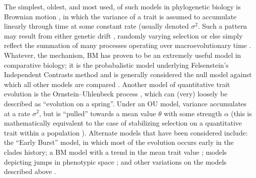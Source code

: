\documentclass[12pt]{article}
\begin{document}
The simplest, oldest, and most used, of such models in phylogenetic biology is Brownian motion \citep[BM;][]{Edwards1964, Felsenstein1971, Thompson1975}, in which the variance of a trait is assumed to accumulate linearly through time at some constant rate (usually denoted $\sigma^2$. Such a pattern may result from either genetic drift \citep{Lande1976, Hansen1996}, randomly varying selection \citep{Felsenstein1973, Felsenstein1988} or else simply reflect the summation of many processes operating over macroevolutionary time \citep{Hansen1996, Uyeda2011, PennellHarmon, PennellPE}. Whatever, the mechanism, BM has proven to be an extremely useful model in comparative biology; it is the probabalistic model underlying Felsenstein's Independent Contrasts method \citep[][see below]{Felsenstein1985} and is generally considered the null model against which all other models are compared \citep{Blomberg2003}. Another model of quantitative trait evolution is the Ornstein--Uhlenbeck process \citep[OU;][]{Felsenstein1988, Hansen1997}, which can (very) loosely be described as ``evolution on a spring''. Under an OU model, variance accumulates at a rate $\sigma^2$, but is ``pulled'' towards a mean value $\theta$ with some strength $\alpha$ (this is mathematically equivalent to the case of stabilizing selection on a quantitative trait within a population \citep{Lande1976}). Alternate models that have been considered include: the ``Early Burst'' \citep[EB;][]{Blomberg2003, Harmon2010, SlaterPennell} model, in which most of the evolution occurs early in the clades history; a BM model with a trend in the mean trait value \citep{Hunt2006}; models depicting jumps in phenotypic space \citep{Landis2012, Eastmanlevy}; and other variations on the models described above \citep[e.g.][]{Pagel1997, Pagel1999, ButlerKing2004, Omeara2006, Eastman2011, Beaulieu2012, SlaterMEE}. 
\end{document}

